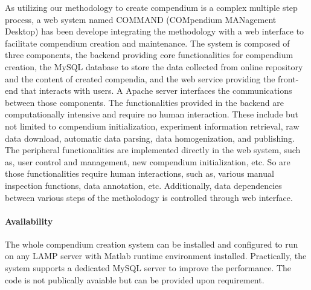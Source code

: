 As utilizing our methodology to create compendium is a complex multiple step
process, a web system named COMMAND (COMpendium MANagement Desktop) has been
develope integrating the methodology with a web interface to facilitate
compendium creation and maintenance.
%
The system is composed of three components, the backend providing core
functionalities for compendium creation, the MySQL database to store the data
collected from online repository and the content of created compendia, and the
web service providing the front-end that interacts with users.  A Apache
server interfaces the communications between those components.
%
The functionalities provided in the backend are computationally intensive and
require no human interaction.  These include but not limited to compendium
initialization, experiment information retrieval, raw data download, automatic
data parsing, data homogenization, and publishing.
%
The peripheral functionalities are implemented directly in the web system,
such as, user control and management, new compendium initialization, etc.  So
are those functionalities require human interactions, such as, various manual
inspection functions, data annotation, etc.  Additionally, data dependencies
between various steps of the metholodogy is controlled through web interface.


\paragraph{Availability} 
The whole compendium creation system can be installed and configured to run
on any LAMP server with Matlab runtime environment installed.  Practically,
the system supports a dedicated MySQL server %
to improve the performance.  The code is not publically avaiable but
can be provided upon requirement.



%
%
%
%


